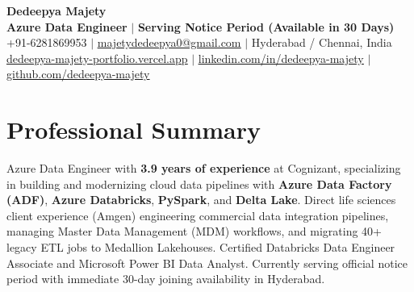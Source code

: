 \documentclass[letterpaper,10pt]{article}
\begin{document}
\begin{center}
    {\Huge \bfseries \color{primaryAccent} Dedeepya Majety} \\ \vspace{2pt}
    \textbf{Azure Data Engineer} $\vert$ \textbf{Serving Notice Period (Available in 30 Days)} \\ \vspace{2pt}
    \small +91-6281869953 $\vert$ \href{mailto:majetydedeepya0@gmail.com}{\underline{majetydedeepya0@gmail.com}} $\vert$ Hyderabad / Chennai, India \\ \vspace{1.5pt}
    \href{https://dedeepya-majety-portfolio.vercel.app}{\underline{dedeepya-majety-portfolio.vercel.app}} $\vert$ \href{https://linkedin.com/in/dedeepya-majety}{\underline{linkedin.com/in/dedeepya-majety}} $\vert$ \href{https://github.com/dedeepya-majety}{\underline{github.com/dedeepya-majety}}
\end{center}
\vspace{-8pt}

\section{Professional Summary}
\small{
Azure Data Engineer with \textbf{3.9 years of experience} at Cognizant, specializing in building and modernizing cloud data pipelines with \textbf{Azure Data Factory (ADF)}, \textbf{Azure Databricks}, \textbf{PySpark}, and \textbf{Delta Lake}. Direct life sciences client experience (Amgen) engineering commercial data integration pipelines, managing Master Data Management (MDM) workflows, and migrating 40+ legacy ETL jobs to Medallion Lakehouses. Certified Databricks Data Engineer Associate and Microsoft Power BI Data Analyst. Currently serving official notice period with immediate 30-day joining availability in Hyderabad.
}
\vspace{-2pt}

\end{document}
